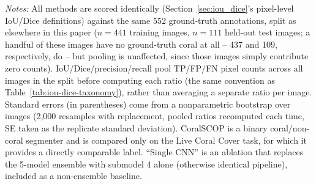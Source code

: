 \documentclass[11pt]{elsarticle}
\begin{document}
\begin{table}[htbp]
\centering
\caption{Live coral cover (coral vs.\ non-coral) segmentation quality: NeuralReefer vs.\ CoralSCOP.}
\label{tab:coralscop-comparison}
\begin{tablenotes}
\item \emph{Notes:} All methods are scored identically (Section~\ref{sec:iou_dice}'s pixel-level IoU/Dice definitions) against the same 552 ground-truth annotations, split as elsewhere in this paper ($n=441$ training images, $n=111$ held-out test images; a handful of these images have no ground-truth coral at all -- 437 and 109, respectively, do -- but pooling is unaffected, since those images simply contribute zero counts). IoU/Dice/precision/recall pool TP/FP/FN pixel counts across all images in the split before computing each ratio (the same convention as Table~\ref{tab:iou-dice-taxonomy}), rather than averaging a separate ratio per image. Standard errors (in parentheses) come from a nonparametric bootstrap over images (2,000 resamples with replacement, pooled ratios recomputed each time, SE taken as the replicate standard deviation). CoralSCOP is a binary coral/non-coral segmenter and is compared only on the Live Coral Cover task, for which it provides a directly comparable label. ``Single CNN'' is an ablation that replaces the 5-model ensemble with submodel 4 alone (otherwise identical pipeline), included as a non-ensemble baseline.
\end{tablenotes}
\end{table}
\end{document}
